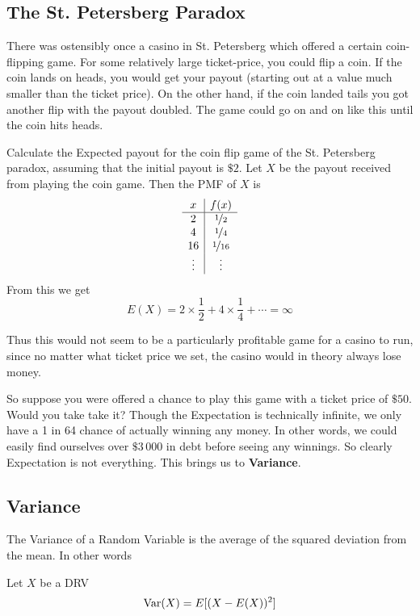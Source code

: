 \documentclass{report}
\begin{document}
\subsection{The St. Petersberg Paradox}
There was ostensibly once a casino in St. Petersberg which offered a certain coin-flipping game. For some relatively large ticket-price, you could flip a coin. If the coin lands on heads, you would get your payout (starting out at a value much smaller than the ticket price). On the other hand, if the coin landed tails you got another flip with the payout doubled. The game could go on and on like this until the coin hits heads.
\begin{example}
    Calculate the Expected payout for the coin flip game of the St. Petersberg paradox, assuming that the initial payout is $\$2$.
    \solution
    Let $X$ be the payout received from playing the coin game. Then the PMF of $X$ is
    \[
        \begin{array}{c|c}
             x & f(x) \\
             \hline
             2 & \nicefrac 12 \\
             4 & \nicefrac 14 \\
             16 & \nicefrac 1{16} \\
             \vdots & \vdots
        \end{array}
    \]
    From this we get
    \[
        E(X) = 2\times \frac 12 + 4 \times \frac 1 4 + \cdots = \infty
    \]
\end{example}
Thus this would not seem to be a particularly profitable game for a casino to run, since no matter what ticket price we set, the casino would in theory always lose money. 

So suppose you were offered a chance to play this game with a ticket price of $\$50$. Would you take take it? Though the Expectation is technically infinite, we only have a 1 in 64 chance of actually winning any money. In other words, we could easily find ourselves over $\$3\,000$ in debt before seeing any winnings.  So clearly Expectation is not everything. This brings us to \textbf{Variance}.

\subsection{Variance}
\newcommand{\Var}{\textup{Var}}
The Variance of a Random Variable is the average of the squared deviation from the mean. In other words
\begin{definition}
    Let $X$ be a DRV 
    \[
        \Var(X)=E[(X-E(X))^2]   
    \]
\end{definition}
\end{document}
